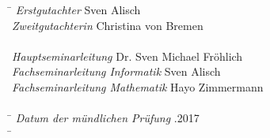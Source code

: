 \begin{titlepage}
\begin{tabbing}
\hspace{20em} \=  \kill
\emph{Erstgutachter} \> Sven Alisch \\
\emph{Zweitgutachterin} \> Christina von Bremen \\
 \> \\
\emph{Hauptseminarleitung} \> Dr. Sven Michael Fröhlich \\
\emph{Fachseminarleitung Informatik} \> Sven Alisch \\
\emph{Fachseminarleitung Mathematik} \> Hayo Zimmermann \\
 \> \\
 \hspace{20em} \=  \kill
\emph{Datum der mündlichen Prüfung} .2017 \\
 \hspace{10em} \=  \kill
\end{tabbing}

\end{titlepage}

